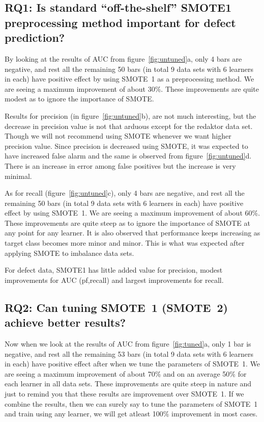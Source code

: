 \subsection{\textbf{RQ1: Is standard ``off-the-shelf'' SMOTE1 preprocessing method important for defect prediction?}}

By looking at the results of AUC from figure~\ref{fig:untuned}a, only 4 bars are negative, and rest all the remaining 50 bars (in total 9 data sets with 6 learners in each) have  positive effect by using SMOTE~1 as a preprocessing method. We are seeing a maximum improvement of about 30\%. These improvements are quite modest as to ignore the importance of SMOTE.

Results for precision (in figure~\ref{fig:untuned}b), are not much interesting, but the decrease in precision value is not that arduous except for the redaktor data set. Though we will not recommend using SMOTE whenever we want higher precision value. Since precision is decreased using SMOTE, it was expected to have increased false alarm \cite{menzies2007problems} and the same is observed from figure~\ref{fig:untuned}d. There is an increase in error among false positives but the increase is very minimal.

As for recall (figure~\ref{fig:untuned}c), only 4 bars are negative, and rest all the remaining 50 bars (in total 9 data sets with 6 learners in each) have positive effect by using SMOTE~1. We are seeing a maximum improvement of about 60\%. These improvements are quite steep as to ignore the importance of SMOTE at any point for any learner. It is also observed that performance keeps increasing as target class becomes more minor and minor. This is what was expected after applying SMOTE to imbalance data sets.

\begin{lesson1}
    For defect data, SMOTE1 has little added value for 
 precision, modest improvements for AUC (pf,recall) and largest improvements for recall.
\end{lesson1}

\subsection{\textbf{RQ2: Can tuning SMOTE~1 (SMOTE~2) achieve better results?}}

Now when we look at the results of AUC from figure~\ref{fig:tuned}a, only 1 bar is negative, and rest all the remaining 53 bars (in total 9 data sets with 6 learners in each) have  positive effect after when we tune the parameters of SMOTE~1. We are seeing a maximum improvement of about 70\% and on an average 50\% for each learner in all data sets. These improvements are quite steep in nature and just to remind you that these results are improvement over SMOTE~1. If we combine the results, then we can surely say to tune the parameters of SMOTE~1 and train using any learner, we will get atleast 100\% improvement in most cases.

